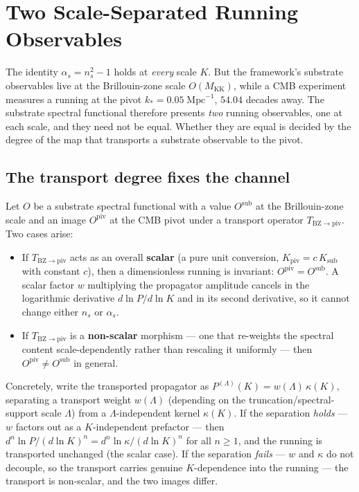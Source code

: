 \documentclass[12pt]{article}
\theoremstyle{definition}
\theoremstyle{remark}
\begin{document}
\section{Two Scale-Separated Running Observables}\label{sec:transport}

The identity $\alpha_s = n_s^2 - 1$ holds at \emph{every} scale $K$. But the framework's substrate observables live at the Brillouin-zone scale $O(M_{\mathrm{KK}})$, while a CMB experiment measures a running at the pivot $k_* = 0.05\;\mathrm{Mpc}^{-1}$, $54.04$ decades away. The substrate spectral functional therefore presents \emph{two} running observables, one at each scale, and they need not be equal. Whether they are equal is decided by the degree of the map that transports a substrate observable to the pivot.

\subsection{The transport degree fixes the channel}\label{sec:transport-degree}

Let $O$ be a substrate spectral functional with a value $O^{\mathrm{sub}}$ at the Brillouin-zone scale and an image $O^{\mathrm{piv}}$ at the CMB pivot under a transport operator $T_{\mathrm{BZ}\to\mathrm{piv}}$. Two cases arise:
\begin{itemize}
  \item If $T_{\mathrm{BZ}\to\mathrm{piv}}$ acts as an overall \textbf{scalar} (a pure unit conversion, $K_{\mathrm{piv}} = c\,K_{\mathrm{sub}}$ with constant $c$), then a dimensionless running is invariant: $O^{\mathrm{piv}} = O^{\mathrm{sub}}$. A scalar factor $w$ multiplying the propagator amplitude cancels in the logarithmic derivative $d\ln P/d\ln K$ and in its second derivative, so it cannot change either $n_s$ or $\alpha_s$.
  \item If $T_{\mathrm{BZ}\to\mathrm{piv}}$ is a \textbf{non-scalar} morphism --- one that re-weights the spectral content scale-dependently rather than rescaling it uniformly --- then $O^{\mathrm{piv}} \neq O^{\mathrm{sub}}$ in general.
\end{itemize}
Concretely, write the transported propagator as $P^{(\Lambda)}(K) = w(\Lambda)\,\kappa(K)$, separating a transport weight $w(\Lambda)$ (depending on the truncation/spectral-support scale $\Lambda$) from a $\Lambda$-independent kernel $\kappa(K)$. If the separation \emph{holds} --- $w$ factors out as a $K$-independent prefactor --- then $d^n \ln P / (d\ln K)^n = d^n \ln \kappa / (d\ln K)^n$ for all $n \geq 1$, and the running is transported unchanged (the scalar case). If the separation \emph{fails} --- $w$ and $\kappa$ do not decouple, so the transport carries genuine $K$-dependence into the running --- the transport is non-scalar, and the two images differ.
\end{document}
